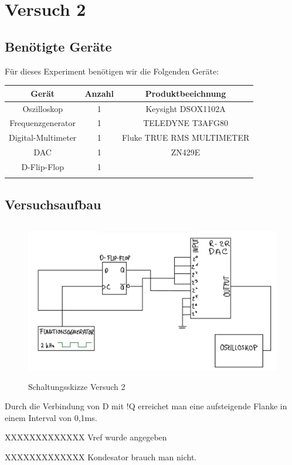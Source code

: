 \chapter{Versuch 2}

\section{Benötigte Geräte}

Für dieses Experiment benötigen wir die Folgenden Geräte:

\begin{tabular}[h]{c|c|c}
    Gerät & Anzahl & Produktbeeichnung\\
    \hline
    Oszilloskop & 1  & Keysight DSOX1102A\\
    \hline
    Frequenzgenerator & 1 & TELEDYNE T3AFG80\\
	\hline 
	Digital-Multimeter & 1 & Fluke TRUE RMS MULTIMETER\\
	\hline
	DAC & 1 & ZN429E \\
	\hline
	D-Flip-Flop & 1 & \\
	\hline
    \label{tab:Materialliste Versuch 2}
\end{tabular}


\section{Versuchsaufbau}
\begin{figure}[H]
	\centering
	\includegraphics[height=7cm]{images/schaltungsskizze-versuch-zwei.jpeg} 
	\caption[]{Schaltungsskizze Versuch 2}
\end{figure}
Durch die Verbindung von D mit !Q erreichet man eine aufsteigende Flanke
in einem Interval von 0,1ms. 

XXXXXXXXXXXXX Vref wurde angegeben

XXXXXXXXXXXXX Kondesator brauch man nicht.

